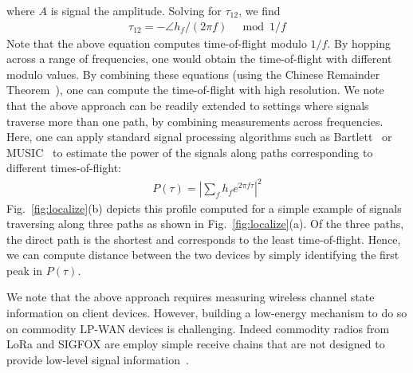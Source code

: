 where $A$ is signal the amplitude. %
%
%
Solving for $\tau_{12}$, we find
%
\begin{align}
\tau_{12} = -\angle h_f /{(2 \pi f)}~~~\mod	1/f	\label{eqn:channelphase}
\end{align}
%
Note that the above equation computes time-of-flight modulo $1/f$. By hopping across a range of frequencies, one would obtain the time-of-flight with different modulo values. By combining these equations (using the Chinese Remainder Theorem~\cite{vasisht2016decimeter, ding1996chinese}), one can compute the time-of-flight with high resolution. We note that the above approach can be readily extended to settings where signals traverse more than one path, by combining measurements across frequencies.  Here, one can apply standard signal processing algorithms such as Bartlett~\cite{kumar2014accurate} or MUSIC~\cite{xiong2013arraytrack} to estimate the power of the signals along paths corresponding to different times-of-flight:
\begin{align}
P(\tau) = \left|\sum_f h_f e^{2 \pi f \tau}\right|^2 \label{eqn:ptau}
\end{align}
Fig.~\ref{fig:localize}(b) depicts this profile computed for a simple example of signals traversing along three paths as shown in Fig.~\ref{fig:localize}(a). Of the three paths, the direct path is the shortest and corresponds to the least time-of-flight. Hence, we can compute distance between the two devices by simply identifying the first peak in $P(\tau)$.

We note that the above approach requires measuring wireless channel state information on client devices. However, building a low-energy mechanism to do so on commodity LP-WAN devices is challenging. Indeed commodity radios from LoRa and SIGFOX are employ simple receive chains that are not designed to provide low-level signal information~\cite{alliance2015lorawan, zuniga2016sigfox}.


